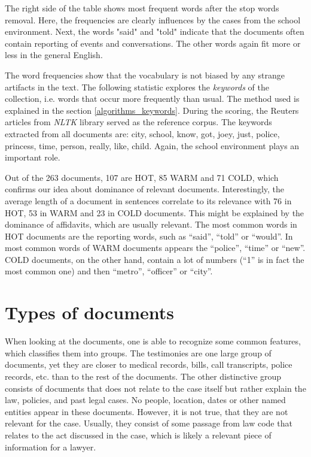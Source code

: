 \documentclass[
  digital, %
  notable,   %
  nolof,     %
  nolot,     %
  draft
]{fithesis3}
\begin{document}
The right side of the table shows most frequent words after the stop words removal.
Here, the frequencies are clearly influences by the cases from the school environment.
Next, the words "said" and "told" indicate that the documents often contain reporting of events and conversations.
The other words again fit more or less in the general English.

The word frequencies show that the vocabulary is not biased by any strange artifacts in the text.
The following statistic explores the \textit{keywords} of the collection, i.e. words that occur more frequently than usual.
The method used is explained in the section \ref{algorithms_keywords}.
During the scoring, the Reuters articles from \textit{NLTK} library served as the reference corpus.
The keywords extracted from all documents are: city, school, know, got, joey, just, police, princess, time, person, really, like, child.
Again, the school environment plays an important role.

Out of the 263 documents, 107 are HOT, 85 WARM and 71 COLD, which confirms our idea about dominance of relevant documents.
Interestingly, the average length of a document in sentences correlate to its relevance with 76 in HOT, 53 in WARM and 23 in COLD documents.
This might be explained by the dominance of affidavits, which are usually relevant.
The most common words in HOT documents are the reporting words, such as ``said'', ``told'' or ``would''. 
In most common words of WARM documents appears the ``police'', ``time'' or ``new''.
COLD documents, on the other hand, contain a lot of numbers (``1'' is in fact the most common one) and then ``metro'', ``officer'' or ``city''.

\section{Types of documents}
When looking at the documents, one is able to recognize some common features, which classifies them into groups.
The testimonies are one large group of documents, yet they are closer to medical records, bills, call transcripts, police records, etc. than to the rest of the documents.
The other distinctive group consists of documents that does not relate to the case itself but rather explain the law, policies, and past legal cases.
No people, location, dates or other named entities appear in these documents.
However, it is not true, that they are not relevant for the case.
Usually, they consist of some passage from law code that relates to the act discussed in the case, which is likely a relevant piece of information for a lawyer.
\end{document}
